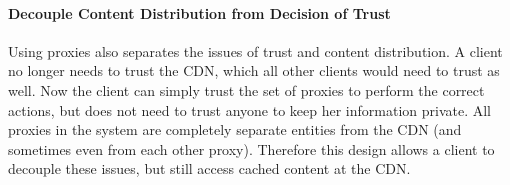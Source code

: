 
\paragraph{Decouple Content Distribution from Decision of Trust} Using proxies also separates the issues of 
trust and content distribution.  A client no longer needs to trust the CDN, which all other clients would 
need to trust as well.  Now the client can simply trust the set of proxies to perform the correct actions, but 
does not need to trust anyone to keep her information private.  All proxies in the system are completely separate entities 
from the CDN (and sometimes even from each other proxy).  Therefore this design allows a client to decouple these 
issues, but still access cached content at the CDN.

